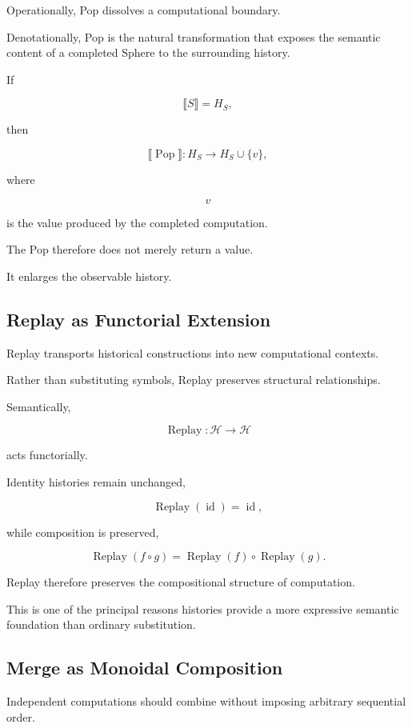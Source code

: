 \documentclass[12pt,oneside]{article}
\theoremstyle{definition}
\theoremstyle{remark}
\begin{document}
Operationally, Pop dissolves a computational boundary.

Denotationally, Pop is the natural transformation that exposes the semantic
content of a completed Sphere to the surrounding history.

If

\[
\llbracket
S
\rrbracket
=
H_S,
\]

then

\[
\llbracket
\operatorname{Pop}
\rrbracket
:
H_S
\longrightarrow
H_S
\cup
\{v\},
\]

where

\[
v
\]

is the value produced by the completed computation.

The Pop therefore does not merely return a value.

It enlarges the observable history.

\subsection{Replay as Functorial Extension}

Replay transports historical constructions into new computational contexts.

Rather than substituting symbols, Replay preserves structural relationships.

Semantically,

\[
\operatorname{Replay}
:
\mathcal H
\longrightarrow
\mathcal H
\]

acts functorially.

Identity histories remain unchanged,

\[
\operatorname{Replay}
(\operatorname{id})
=
\operatorname{id},
\]

while composition is preserved,

\[
\operatorname{Replay}
(f\circ g)
=
\operatorname{Replay}(f)
\circ
\operatorname{Replay}(g).
\]

Replay therefore preserves the compositional structure of computation.

This is one of the principal reasons histories provide a more expressive
semantic foundation than ordinary substitution.

\subsection{Merge as Monoidal Composition}

Independent computations should combine without imposing arbitrary sequential
order.
\end{document}
